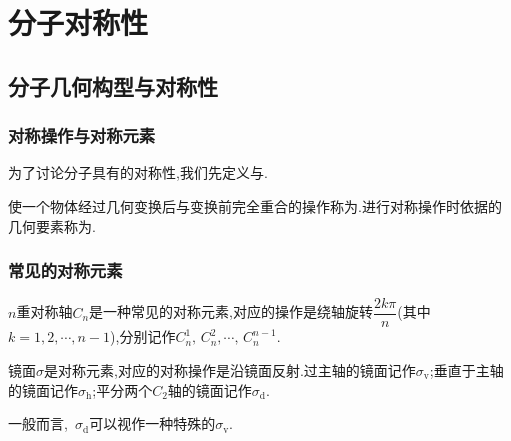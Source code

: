 \documentclass{ctexbook}
\begin{document}
\chapter{分子对称性}
\section{分子几何构型与对称性}
\subsection{对称操作与对称元素}
为了讨论分子具有的对称性,我们先定义与.
\begin{definition}[对称操作与对称元素]
    使一个物体经过几何变换后与变换前完全重合的操作称为.进行对称操作时依据的几何要素称为.
\end{definition}
\subsection{常见的对称元素}
\begin{definition}[旋转轴]
    $n$重对称轴$C_n$是一种常见的对称元素,对应的操作是绕轴旋转$\dfrac{2k\pi}{n}$(其中$k=1,2,\cdots,n-1$),分别记作$C_n^1,\,C_n^2,\cdots,\,C_{n}^{n-1}$.
\end{definition}
\begin{definition}[镜面]
    镜面$\sigma$是对称元素,对应的对称操作是沿镜面反射.过主轴的镜面记作$\sigma_{\text{v}}$;垂直于主轴的镜面记作$\sigma_{\text{h}}$;平分两个$C_2$轴的镜面记作$\sigma_{\text{d}}$.
\end{definition}
一般而言,~$\sigma_{\text{d}}$可以视作一种特殊的$\sigma_{\text{v}}$.
\end{document}
